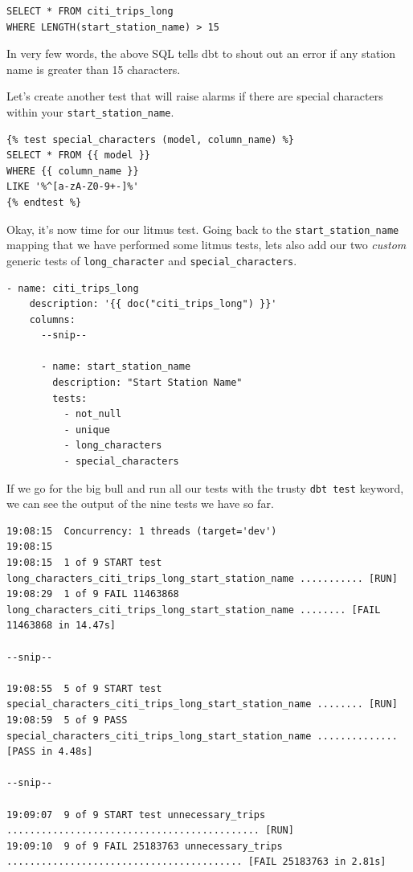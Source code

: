 \documentclass[
]{book}
\begin{document}
\begin{verbatim}
SELECT * FROM citi_trips_long
WHERE LENGTH(start_station_name) > 15 
\end{verbatim}

In very few words, the above SQL tells dbt to shout out an error if any station name is greater than 15 characters.

Let's create another test that will raise alarms if there are special characters within your \texttt{start\_station\_name}.

\begin{verbatim}
{% test special_characters (model, column_name) %}
SELECT * FROM {{ model }}
WHERE {{ column_name }}
LIKE '%^[a-zA-Z0-9+-]%'
{% endtest %}
\end{verbatim}

Okay, it's now time for our litmus test. Going back to the \texttt{start\_station\_name} mapping that we have performed some litmus tests, lets also add our two \emph{custom} generic tests of \texttt{long\_character} and \texttt{special\_characters}.

\begin{verbatim}
- name: citi_trips_long
    description: '{{ doc("citi_trips_long") }}'
    columns:
      --snip--

      - name: start_station_name
        description: "Start Station Name"
        tests:
          - not_null
          - unique
          - long_characters
          - special_characters
\end{verbatim}

If we go for the big bull and run all our tests with the trusty \texttt{dbt\ test} keyword, we can see the output of the nine tests we have so far.

\begin{verbatim}
19:08:15  Concurrency: 1 threads (target='dev')
19:08:15  
19:08:15  1 of 9 START test long_characters_citi_trips_long_start_station_name ........... [RUN]
19:08:29  1 of 9 FAIL 11463868 long_characters_citi_trips_long_start_station_name ........ [FAIL 11463868 in 14.47s]

--snip--

19:08:55  5 of 9 START test special_characters_citi_trips_long_start_station_name ........ [RUN]
19:08:59  5 of 9 PASS special_characters_citi_trips_long_start_station_name .............. [PASS in 4.48s]

--snip--

19:09:07  9 of 9 START test unnecessary_trips ............................................ [RUN]
19:09:10  9 of 9 FAIL 25183763 unnecessary_trips ......................................... [FAIL 25183763 in 2.81s]
\end{verbatim}
\end{document}

